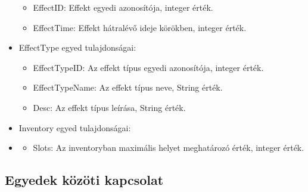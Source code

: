 \begin{itemize}
    \begin{itemize}
        \item EffectID: Effekt egyedi azonosítója, integer érték.
        \item EffectTime: Effekt hátralévő ideje körökben, integer érték.
    \end{itemize}

    \item EffectType egyed tulajdonságai:

    \begin{itemize}
        \item EffectTypeID: Az effekt típus egyedi azonosítója, integer érték.
        \item EffectTypeName: Az effekt típus neve, String érték.
        \item Desc: Az effekt típus leírása, String érték.
    \end{itemize}

    \item Inventory egyed tulajdonságai:
    \item 
    \begin{itemize}
        \item Slots: Az inventoryban maximális helyet meghatározó érték, integer érték.
    \end{itemize}

\end{itemize}

\subsection{Egyedek közöti kapcsolat}

